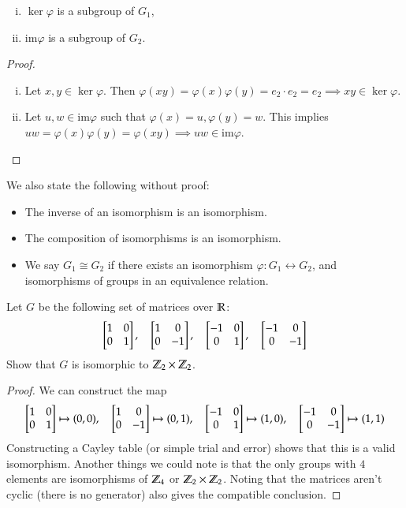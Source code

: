 \begin{proposition}
\!
\begin{enumerate}[(i)]
	\item $\ker \varphi$ is a subgroup of $G_1$, 
	\item $\mathrm{im} \varphi$ is a subgroup of $G_2$. 
\end{enumerate}	
\end{proposition}

\begin{proof}
\!
\begin{enumerate}[(i)]
	\item Let $x, y\in \ker \varphi$. Then $\varphi(xy)=\varphi(x)\varphi(y)=e_2\cdot e_2=e_2\implies xy\in \ker \varphi$. 
	\item Let $u, w\in \mathrm{im} \varphi$ such that $\varphi(x) = u, \varphi(y) = w$. This implies $uw = \varphi(x)\varphi(y) = \varphi(xy)\implies uw\in \mathrm{im}\varphi$. 
\end{enumerate}	
\end{proof}

We also state the following without proof: 
\begin{itemize}
\item The inverse of an isomorphism is an isomorphism. 
\item The composition of isomorphisms is an isomorphism. 
\item We say $G_1\cong G_2$ if there exists an isomorphism $\varphi: G_1\leftrightarrow G_2$, and isomorphisms of groups in an equivalence relation. 	
\end{itemize}

 Let $G$ be the following set of matrices over $\mathbb{R}$: 
\[\mtrx{1 & 0 \\ 0 & 1}, \quad \mtrx{1 & 0 \\ 0 & -1}, \quad \mtrx{-1 & 0 \\ 0 & 1}, \quad \mtrx{-1 & 0 \\ 0 & -1}\]
Show that $G$ is isomorphic to $\mathbb{Z}_2\times \mathbb{Z}_2$. 
\begin{proof}
We can construct the map 
\[\mtrx{1 & 0 \\ 0 & 1} \mapsto (0,0), \quad \mtrx{1 & 0 \\ 0 & -1}  \mapsto (0, 1), \quad \mtrx{-1 & 0 \\ 0 & 1}  \mapsto (1, 0), \quad \mtrx{-1 & 0 \\ 0 & -1}  \mapsto (1,1)\]
Constructing a Cayley table (or simple trial and error) shows that this is a valid isomorphism. Another things we could note is that the only groups with $4$ elements are isomorphisms of $\mathbb{Z}_4$ or $\mathbb{Z}_2\times\mathbb{Z}_2$. Noting that the matrices aren't cyclic (there is no generator) also gives the compatible conclusion. 
\end{proof}

